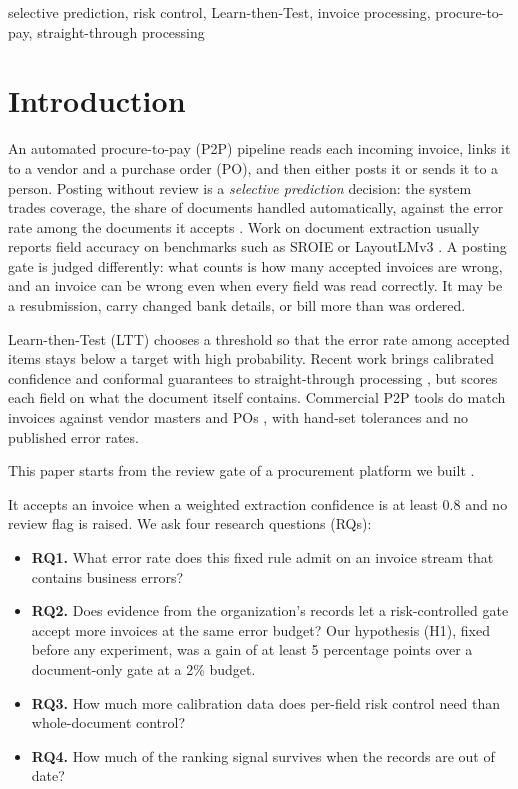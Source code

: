 \documentclass[conference]{IEEEtran}
\newif\ifanon
\begin{document}
\begin{IEEEkeywords}
selective prediction, risk control, Learn-then-Test, invoice processing,
procure-to-pay, straight-through processing
\end{IEEEkeywords}

\section{Introduction}\label{sec:intro}
An automated procure-to-pay (P2P) pipeline reads each incoming invoice, links it
to a vendor and a purchase order (PO), and then either posts it or sends it to a
person. Posting without review is a \emph{selective prediction} decision: the
system trades coverage, the share of documents handled automatically, against
the error rate among the documents it accepts \cite{elyaniv2010,geifman2017}.
Work on document extraction usually reports field accuracy on benchmarks such as
SROIE \cite{huang2019sroie} or LayoutLMv3 \cite{huang2022layoutlmv3}. A posting gate is judged differently:
what counts is how many accepted invoices are wrong, and an invoice can be wrong even
when every field was read correctly. It may be a resubmission, carry changed bank
details, or bill more than was ordered.

Learn-then-Test (LTT) \cite{angelopoulos2025ltt} chooses a threshold so that the
error rate among accepted items stays below a target with high probability.
Recent work brings calibrated confidence and conformal guarantees to
straight-through processing \cite{jin2026plv,rombach2026},
but scores each field on what the document itself
contains. Commercial P2P tools do match invoices against vendor masters and
POs \cite{rossum2026rules,rossum2026mdh,sapariba2026}, with hand-set tolerances
and no published error rates.

\ifanon
This paper starts from the review gate of a deployed procurement
platform \cite{more2026report}.
\else
This paper starts from the review gate of a procurement platform we
built \cite{more2026report}.
\fi
It accepts an invoice when a weighted extraction confidence is at least 0.8 and
no review flag is raised. We ask four research questions (RQs):
\begin{itemize}
\item \textbf{RQ1.} What error rate does this fixed rule admit on an invoice
stream that contains business errors?
\item \textbf{RQ2.} Does evidence from the organization's records let a
risk-controlled gate accept more invoices at the same error budget? Our
hypothesis (H1), fixed before any experiment, was a
gain of at least 5 percentage points over a document-only gate at a 2\% budget.
\item \textbf{RQ3.} How much more calibration data does per-field risk control
need than whole-document control?
\item \textbf{RQ4.} How much of the ranking signal survives when the records
are out of date?
\end{itemize}
\end{document}
